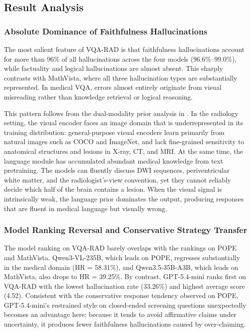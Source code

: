 
\subsection{Result Analysis}

\subsubsection{Absolute Dominance of Faithfulness Hallucinations}

The most salient feature of VQA-RAD is that faithfulness hallucinations
account for more than 96\% of all hallucinations
across the four models (96.6\%--99.0\%),
while factuality and logical hallucinations are almost absent.
This sharply contrasts with MathVista,
where all three hallucination types are substantially represented.
In medical VQA, errors almost entirely originate
from visual misreading rather than knowledge retrieval
or logical reasoning.

This pattern follows from the dual-modality prior analysis
in .
In the radiology setting,
the visual encoder faces an image domain
that is underrepresented in its training distribution:
general-purpose visual encoders learn primarily
from natural images such as COCO and ImageNet,
and lack fine-grained sensitivity
to anatomical structures and lesions in X-ray, CT, and MRI.
At the same time,
the language module has accumulated abundant medical knowledge
from text pretraining.
The models can fluently discuss DWI sequences,
periventricular white matter,
and the radiologist's-view convention,
yet they cannot reliably decide
which half of the brain contains a lesion.
When the visual signal is intrinsically weak,
the language prior dominates the output,
producing responses that are fluent in medical language
but visually wrong.

\subsubsection{Model Ranking Reversal and Conservative Strategy Transfer}

The model ranking on VQA-RAD barely overlaps
with the rankings on POPE and MathVista.
Qwen3-VL-235B, which leads on POPE,
regresses substantially in the medical domain
(HR = 58.31\%),
and Qwen3.5-35B-A3B,
which leads on MathVista,
also drops to HR = 39.25\%.
By contrast,
GPT-5.4-mini ranks first on VQA-RAD
with the lowest hallucination rate (33.26\%)
and highest average score (4.52).
Consistent with the conservative response tendency observed on POPE,
GPT-5.4-mini's restrained style on closed-ended screening questions
unexpectedly becomes an advantage here:
because it tends to avoid affirmative claims under uncertainty,
it produces fewer faithfulness hallucinations caused by over-claiming.

